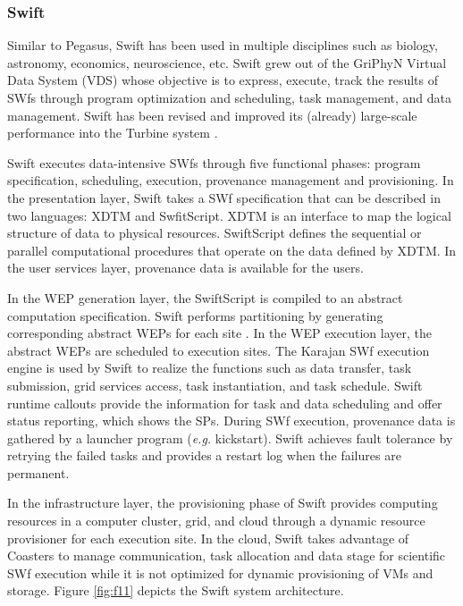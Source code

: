 \subsubsection{Swift}
Similar to Pegasus, Swift \cite{Zhao2007} has been used in multiple disciplines such as biology,
astronomy, economics, neuroscience, etc. Swift grew out of the GriPhyN
Virtual Data System (VDS) whose objective is to express, execute,
track the results of SWfs through program optimization and
scheduling, task management, and data management. Swift has been revised and 
improved its (already) large-scale performance into the Turbine system \cite{Wozniak2012}.

Swift executes data-intensive SWfs
through five functional phases: program specification, scheduling,
execution, provenance management and provisioning.
In the presentation layer, Swift takes a SWf specification that
can be described in two languages: XDTM and SwfitScript.
XDTM is an interface to map the logical structure of data to physical
resources. SwiftScript defines the sequential or parallel computational procedures that operate
on the data defined by XDTM. 
In the user services layer, provenance data is available for the users.

In the WEP generation layer, the SwiftScript is compiled
to an abstract computation specification. Swift performs partitioning by generating corresponding abstract WEPs for each site \cite{Zhao2007}.
In the WEP execution layer, the abstract WEPs are scheduled to execution sites.
The Karajan SWf execution engine is used by Swift to realize the functions such as data transfer, task
submission, grid services access, task instantiation, and task schedule. 
Swift runtime callouts provide the information for task and data scheduling and
offer status reporting, which shows the SPs. 
During SWf execution,
provenance data is gathered by a launcher program (\textit{e.g.} kickstart). Swift achieves fault tolerance by retrying the failed tasks
and provides a restart log when the failures are permanent.

In the infrastructure layer, the provisioning phase of Swift provides computing resources in a computer cluster, grid, and cloud through a dynamic resource provisioner for each execution site. 
In the cloud, Swift takes advantage of Coasters \cite{Hategan2011} to manage communication, task allocation and data stage for scientific SWf execution while it is not optimized for dynamic provisioning of VMs and storage. 
Figure \ref{fig:f11} depicts the Swift system architecture.

